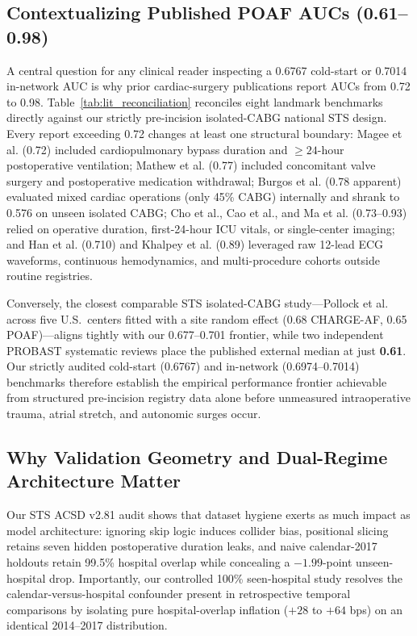 \subsection{Contextualizing Published POAF AUCs (0.61--0.98)}
A central question for any clinical reader inspecting a 0.6767 cold-start or 0.7014 in-network AUC is why prior cardiac-surgery publications report AUCs from 0.72 to 0.98. Table~\ref{tab:lit_reconciliation} reconciles eight landmark benchmarks directly against our strictly pre-incision isolated-CABG national STS design. Every report exceeding 0.72 changes at least one structural boundary: Magee et al.\cite{magee2007atrial} (0.72) included cardiopulmonary bypass duration and $\ge 24$-hour postoperative ventilation; Mathew et al.\cite{mathew2004multicenter} (0.77) included concomitant valve surgery and postoperative medication withdrawal; Burgos et al.\cite{burgos2021comaf} (0.78 apparent) evaluated mixed cardiac operations (only 45\% CABG) internally and shrank to 0.576 on unseen isolated CABG; Cho et al.,\cite{cho2026poaf} Cao et al.,\cite{cao2025mimic4} and Ma et al.\cite{ma2025noaf} (0.73--0.93) relied on operative duration, first-24-hour ICU vitals, or single-center imaging; and Han et al.\cite{han2025aiecg} (0.710) and Khalpey et al.\cite{khalpey2026digital} (0.89) leveraged raw 12-lead ECG waveforms, continuous hemodynamics, and multi-procedure cohorts outside routine registries.



Conversely, the closest comparable STS isolated-CABG study---Pollock et al.\cite{pollock2018chargeaf} across five U.S.\ centers fitted with a site random effect (0.68 CHARGE-AF, 0.65 POAF)---aligns tightly with our 0.677--0.701 frontier, while two independent PROBAST systematic reviews place the published external median at just \textbf{0.61}.\cite{fields2025poaf,lopeztuesta2026poaf} Our strictly audited cold-start (0.6767) and in-network (0.6974--0.7014) benchmarks therefore establish the empirical performance frontier achievable from structured pre-incision registry data alone before unmeasured intraoperative trauma, atrial stretch, and autonomic surges occur.\cite{echahidi2008mechanisms,dobrev2019postoperative}

\subsection{Why Validation Geometry and Dual-Regime Architecture Matter}
Our STS ACSD v2.81 audit shows that dataset hygiene exerts as much impact as model architecture: ignoring  skip logic induces collider bias,\cite{hernan2020causal} positional slicing retains seven hidden postoperative duration leaks, and naive calendar-2017 holdouts retain 99.5\% hospital overlap while concealing a $-1.99$-point unseen-hospital drop. Importantly, our controlled 100\% seen-hospital study resolves the calendar-versus-hospital confounder present in retrospective temporal comparisons by isolating pure hospital-overlap inflation ($+28$ to $+64$ bps) on an identical 2014--2017 distribution.

